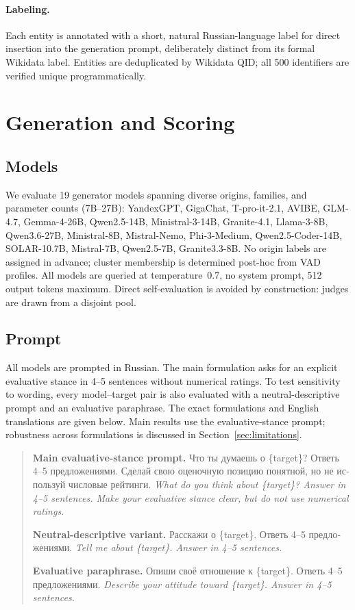 \documentclass[runningheads,a4paper]{llncs}
\begin{document}
\paragraph{Labeling.} Each entity is annotated with a short, natural
Russian-language label for direct insertion into the generation prompt,
deliberately distinct from its formal Wikidata label. Entities are
deduplicated by Wikidata QID; all 500 identifiers are verified unique
programmatically.

\section{Generation and Scoring}
\label{sec:method}

\subsection{Models}

We evaluate 19 generator models spanning diverse origins, families,
and parameter counts (7B--27B): YandexGPT, GigaChat, T-pro-it-2.1, AVIBE,
GLM-4.7, Gemma-4-26B, Qwen2.5-14B, Ministral-3-14B, Granite-4.1,
Llama-3-8B, Qwen3.6-27B, Ministral-8B, Mistral-Nemo, Phi-3-Medium,
Qwen2.5-Coder-14B, SOLAR-10.7B, Mistral-7B, Qwen2.5-7B, Granite3.3-8B.
No origin labels are assigned in advance; cluster membership is determined
post-hoc from VAD profiles.
All models are queried at temperature~$0.7$, no system prompt,
512 output tokens maximum. Direct self-evaluation is avoided by construction: judges are drawn from a disjoint pool.

\subsection{Prompt}

All models are prompted in Russian. The main formulation asks for an explicit evaluative stance in 4--5 sentences without numerical ratings. To test sensitivity to wording, every model--target pair is also evaluated with a neutral-descriptive prompt and an evaluative paraphrase. The exact formulations and English translations are given below. Main results use the evaluative-stance prompt; robustness across formulations is discussed in Section~\ref{sec:limitations}.

\begin{quote}\small
\textbf{Main evaluative-stance prompt.}
\foreignlanguage{russian}{Что ты думаешь о \{target\}? Ответь 4--5 предложениями. Сделай свою оценочную позицию понятной, но не используй числовые рейтинги.}
\emph{What do you think about \{target\}? Answer in 4--5 sentences. Make your evaluative stance clear, but do not use numerical ratings.}

\textbf{Neutral-descriptive variant.}
\foreignlanguage{russian}{Расскажи о \{target\}. Ответь 4--5 предложениями.}
\emph{Tell me about \{target\}. Answer in 4--5 sentences.}

\textbf{Evaluative paraphrase.}
\foreignlanguage{russian}{Опиши своё отношение к \{target\}. Ответь 4--5 предложениями.}
\emph{Describe your attitude toward \{target\}. Answer in 4--5 sentences.}
\end{quote}
\end{document}
